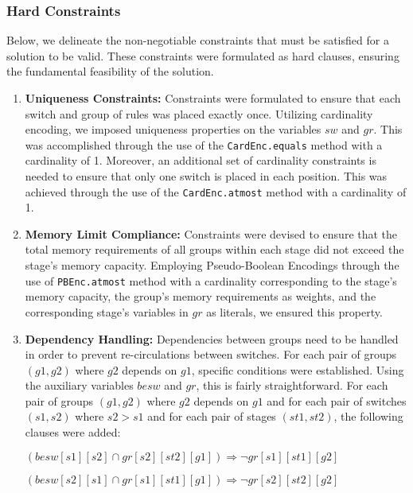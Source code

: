 \subsubsection{Hard Constraints}

Below, we delineate the non-negotiable constraints that must be satisfied for a solution to be valid. These constraints were formulated as hard clauses, ensuring the fundamental feasibility of the solution.

\begin{enumerate}
    \item \textbf{Uniqueness Constraints:} Constraints were formulated to ensure that each switch and group of rules was placed exactly once. Utilizing cardinality encoding, we imposed uniqueness properties on the variables \(sw\) and \(gr\). This was accomplished through the use of the \texttt{CardEnc.equals} method with a cardinality of 1. Moreover, an additional set of cardinality constraints is needed to ensure that only one switch is placed in each position. This was achieved through the use of the \texttt{CardEnc.atmost} method with a cardinality of 1.

    \item \textbf{Memory Limit Compliance:} Constraints were devised to ensure that the total memory requirements of all groups within each stage did not exceed the stage's memory capacity. Employing Pseudo-Boolean Encodings through the use of \texttt{PBEnc.atmost} method with a cardinality corresponding to the stage's memory capacity, the group's memory requirements as weights, and the corresponding stage's variables in \(gr\) as literals, we ensured this property.

    \item \textbf{Dependency Handling:} Dependencies between groups need to be handled in order to prevent re-circulations between switches. For each pair of groups \((g1, g2)\) where \(g2\) depends on \(g1\), specific conditions were established. Using the auxiliary variables \(besw\) and \(gr\), this is fairly straightforward. For each pair of groups \((g1, g2)\) where \(g2\) depends on \(g1\) and for each pair of switches \((s1, s2)\) where \(s2 > s1\) and for each pair of stages \((st1, st2)\), the following clauses were added:
    \begin{center}
        \((besw[s1][s2] \cap gr[s2][st2][g1])\Rightarrow \lnot gr[s1][st1][g2]\)

        \((besw[s2][s1] \cap gr[s1][st1][g1])\Rightarrow \lnot gr[s2][st2][g2]\)
    \end{center}
\end{enumerate}

